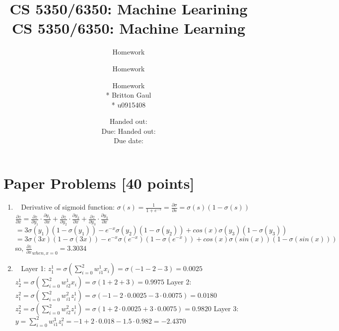 \documentclass[12pt, fullpage,letterpaper]{article}
\title{CS 5350/6350: Machine Learining \semester}
\author{Homework \assignmentId}
\date{Handed out: \releaseDate\\
	Due: \dueDate}
\title{CS 5350/6350: Machine Learning \semester}
\author{Homework \assignmentId}
\date{Handed out: \releaseDate\\
  Due date: \dueDate}
\author{Homework \assignmentId \\* Britton Gaul \\* u0915408}
\begin{document}
\maketitle


\newcommand{\Hcal}{\mathcal{H}} 


\section{Paper Problems [40 points]}
\begin{enumerate}
	\item~
	\newline  Derivative of sigmoid function:
	\newline $\sigma(s)=\frac{1}{1+e^{-s}} = \frac{\partial\sigma}{\partial s}=\sigma(s)(1-\sigma(s))$
	\newline
	\newline $\frac{\partial z}{\partial x}=\frac{\partial z}{\partial y_1}\cdot\frac{\partial y_1}{\partial x}+\frac{\partial z}{\partial y_2}\cdot\frac{\partial y_2}{\partial x}+\frac{\partial z}{\partial y_3}\cdot\frac{\partial y_3}{\partial x}$
	\newline $=3\sigma(y_1)(1-\sigma(y_1))-e^{-x}\sigma(y_2)(1-\sigma(y_2))+cos(x)\sigma(y_3)(1-\sigma(y_3))$
	\newline $=3\sigma(3x)(1-\sigma(3x))-e^{-x}\sigma(e^{-x})(1-\sigma(e^{-x}))+cos(x)\sigma(sin(x))(1-\sigma(sin(x)))$
	\newline so, 
	\newline $\frac{\partial z}{\partial x}_{when, x=0} = 3.3034$
	
	\item~
	\newline Layer 1:
	\newline $z^1_1=\sigma(\sum_{i=0}^{2}w^1_{i1}x_i)=\sigma(-1-2-3)=0.0025$
	\newline $z^1_2=\sigma(\sum_{i=0}^{2}w^1_{i2}x_i)=\sigma(1+2+3)=0.9975$
	\newline Layer 2:
	\newline $z^2_1=\sigma(\sum_{i=0}^{2}w^2_{i1}z^1_i)=\sigma(-1-2\cdot 0.0025-3\cdot0.0075)=0.0180$
	\newline $z^2_2=\sigma(\sum_{i=0}^{2}w^2_{i2}z^1_i)=\sigma(1+2\cdot 0.0025+3\cdot0.0075)=0.9820$
	\newline Layer 3:
	\newline $y=\sum_{i=0}^{2}w^3_{i1}z^2_i=-1+2\cdot0.018-1.5\cdot0.982=-2.4370$
	
	

\end{enumerate}
\end{document}
